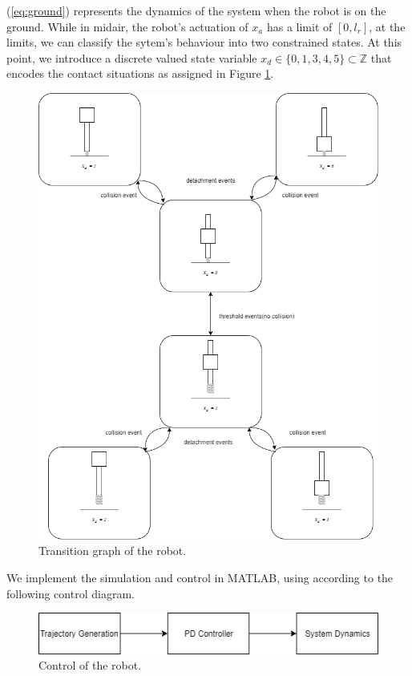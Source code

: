 \documentclass[12pt, a4paper]{report}
\begin{document}
(\ref{eq:ground}) represents the dynamics of the system when the robot is on the ground. While in midair, the robot's actuation of $x_{a}$ has a limit of $[0, l_{r}]$, at the limits, we can classify the sytem's behaviour into two constrained states. At this point, we introduce a discrete valued state variable $x_{d} \in \{0, 1, 3, 4, 5\} \subset \mathbb{Z}$ that encodes the contact situations as assigned in Figure \ref{fig:contactdiagram}.\par

\begin{figure}[h]
	\vspace{1pt}
	\centering
	\includegraphics[scale=0.6]{images/transitiongraph.png} 
	\caption{Transition graph of the robot.}
	\label{fig:contactdiagram}
\end{figure}
\FloatBarrier
We implement the simulation and control in MATLAB, using according to the following control diagram.

\begin{figure}[h]
	\vspace{1pt}
	\centering
	\includegraphics[scale=0.6]{images/systemblockdiagram.png} 
	\caption{Control of the robot.}
	\label{fig:blockdiagram}
\end{figure}\par
\end{document}
